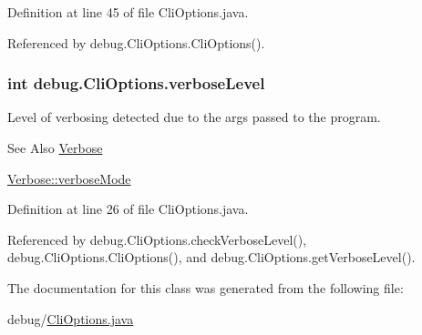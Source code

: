 Definition at line 45 of file Cli\-Options.\-java.



Referenced by debug.\-Cli\-Options.\-Cli\-Options().

\hypertarget{classdebug_1_1_cli_options_a3a7a5235344ee51904e2314dd5fbf7ec}{
\subsubsection[{verbose\-Level}]{\setlength{\rightskip}{0pt plus 5cm}int debug.\-Cli\-Options.\-verbose\-Level\hspace{0.3cm}{\ttfamily [protected]}}}\label{classdebug_1_1_cli_options_a3a7a5235344ee51904e2314dd5fbf7ec}


Level of verbosing detected due to the args passed to the program. 

\begin{DoxySeeAlso}{See Also}
\hyperlink{classdebug_1_1_verbose}{Verbose} 

\hyperlink{classdebug_1_1_verbose_a2269eebcfd65682c66c8401d59bb0d70}{Verbose\-::verbose\-Mode} 
\end{DoxySeeAlso}


Definition at line 26 of file Cli\-Options.\-java.



Referenced by debug.\-Cli\-Options.\-check\-Verbose\-Level(), debug.\-Cli\-Options.\-Cli\-Options(), and debug.\-Cli\-Options.\-get\-Verbose\-Level().



The documentation for this class was generated from the following file\-:\begin{DoxyCompactItemize}
\item 
debug/\hyperlink{_cli_options_8java}{Cli\-Options.\-java}\end{DoxyCompactItemize}
